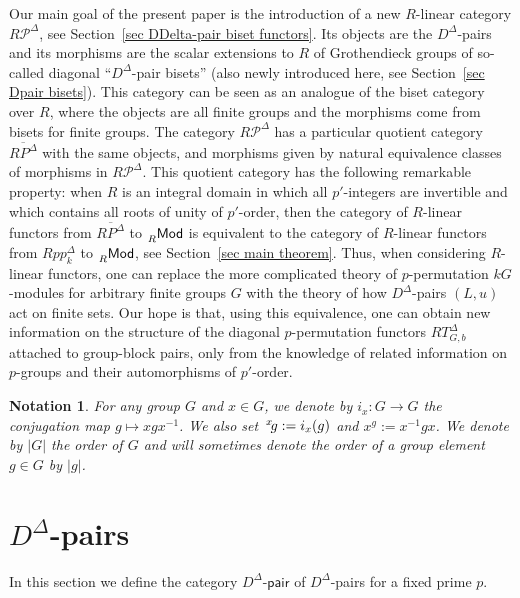 \documentclass[11pt]{article}
\theoremstyle{change}  %
\newtheorem{notation}[theorem]{Notation}
\newcommand{\catfont}{\mathsf}
\newcommand{\lexp}[2]{\setbox0=\hbox{$#2$} \setbox1=\vbox to
                 \ht0{}\,\box1^{#1}\!#2}
\newcommand{\lMod}[1]{\llap{\phantom{|}}_{#1}\catfont{Mod}}
\newcommand{\DD}{D^{\Delta}}
\newcommand{\Dpaircat}{\DD\text{-}\mathsf{pair}}
\begin{document}
Our main goal of the present paper is the introduction of a new $R$-linear category $R\mathcal{P}^\Delta$, see Section~\ref{sec DDelta-pair biset functors}. Its objects are the $D^\Delta$-pairs and its morphisms are the scalar extensions to $R$ of Grothendieck groups of so-called diagonal ``$D^\Delta$-pair bisets'' (also newly introduced here, see Section~\ref{sec Dpair bisets}). This category can be seen as an analogue of the biset category over $R$, where the objects are all finite groups and the morphisms come from bisets for finite groups. The category $R\mathcal{P}^\Delta$ has a particular quotient category $\overline{RP^\Delta}$ with the same objects, and morphisms given by natural equivalence classes of morphisms in $R\mathcal{P}^\Delta$. This quotient category has the following remarkable property: when $R$ is an integral domain in which all $p'$-integers are invertible and which contains all roots of unity of $p'$-order, then the category of $R$-linear functors from $\overline{RP^\Delta}$ to $\lMod{R}$ is equivalent to the category of $R$-linear functors from $Rpp_k^\Delta$ to $\lMod{R}$, see Section~\ref{sec main theorem}. Thus, when considering $R$-linear functors, one can replace the more complicated theory of $p$-permutation $kG$-modules for arbitrary finite groups $G$ with the theory of how $D^\Delta$-pairs $(L,u)$ act on finite sets. Our hope is that, using this equivalence, one can obtain new information on the structure of the diagonal $p$-permutation functors $RT^\Delta_{G,b}$ attached to group-block pairs, only from the knowledge of related information on $p$-groups and their automorphisms of $p'$-order.



\begin{notation}
For any group $G$ and $x\in G$, we denote by $i_x\colon G\to G$ the conjugation map $g\mapsto xgx^{-1}$. We also set $\lexp{x}{g}:=i_x(g)$ and $x^g:= x^{-1}gx$. We denote by $|G|$ the order of $G$ and will sometimes denote the order of a group element $g\in G$ by $|g|$.
\end{notation}




\section{$\DD$-pairs}

In this section we define the category $\Dpaircat$ of $\DD$-pairs for a fixed prime $p$.
\end{document}
